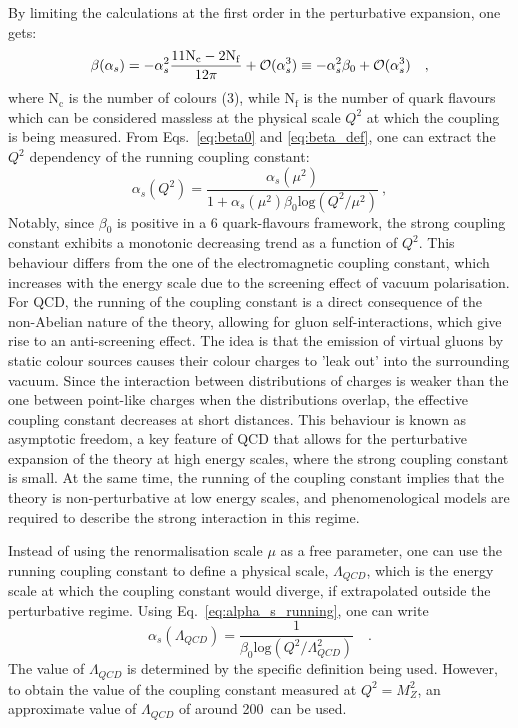 By limiting the calculations at the first order in the perturbative expansion, one gets:
\begin{equation}\label{eq:beta0}
    \beta(\alpha_s) = -\alpha_s^2 \frac{11 \mathrm{N_c} - 2 \mathrm{N_f}}{12\pi} + \mathcal{O}(\alpha_s^3) \equiv -\alpha_s^2 \beta_0 + \mathcal{O}(\alpha_s^3)\quad ,
\end{equation}
where $\mathrm{N_c}$ is the number of colours (3), while $\mathrm{N_f}$ is the number of quark flavours which can be considered massless at the physical scale $Q^2$ at which the coupling is being measured.
From Eqs.~\ref{eq:beta0} and \ref{eq:beta_def}, one can extract the $Q^2$ dependency of the running coupling constant:
\begin{equation}\label{eq:alpha_s_running}
    \alpha_s(Q^2) = \frac{\alpha_s(\mu^2)}{1+\alpha_s(\mu^2)\beta_0 \mathrm{log}(Q^2/\mu^2)}\ ,
\end{equation}
Notably, since $\beta_0$ is positive in a 6 quark-flavours framework, the strong coupling constant exhibits a monotonic decreasing trend as a function of $Q^2$. This behaviour differs from the one of the electromagnetic coupling constant, which increases with the energy scale due to the screening effect of vacuum polarisation. For QCD, the running of the coupling constant is a direct consequence of the non-Abelian nature of the theory, allowing for gluon self-interactions, which give rise to an anti-screening effect. The idea is that the emission of virtual gluons by static colour sources causes their colour charges to 'leak out' into the surrounding vacuum. Since the interaction between distributions of charges is weaker than the one between point-like charges when the distributions overlap, the effective coupling constant decreases at short distances. This behaviour is known as asymptotic freedom, a key feature of QCD that allows for the perturbative expansion of the theory at high energy scales, where the strong coupling constant is small. At the same time, the running of the coupling constant implies that the theory is non-perturbative at low energy scales, and phenomenological models are required to describe the strong interaction in this regime. 

Instead of using the renormalisation scale $\mu$ as a free parameter, one can use the running coupling constant to define a physical scale, $\Lambda_{QCD}$, which is the energy scale at which the coupling constant would diverge, if extrapolated outside the perturbative regime. Using Eq.~\ref{eq:alpha_s_running}, one can write
\begin{equation*}
    \alpha_s(\Lambda_{QCD}) = \frac{1}{\beta_0 \mathrm{log}(Q^2/\Lambda_{QCD}^2)}\quad .
\end{equation*}
The value of $\Lambda_{QCD}$ is determined by the specific definition being used. However, to obtain the value of the coupling constant measured at $Q^2 = M_Z^2$, an approximate value of $\Lambda_{QCD}$ of around 200~\mev can be used.


